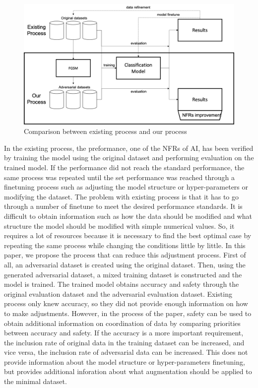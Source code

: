 \documentclass[journal,article,submit,moreauthors,pdftex]{Definitions/mdpi}
\begin{document}
\begin{figure}[H]
    \includegraphics[width=13 cm]{Definitions/comparison.png}
    \caption{Comparison between existing process and our process\label{comparison}}
\end{figure} 

In the existing process, the preformance, one of the NFRs of AI, has been verified by training the model using the original dataset and performing evaluation on the trained model.
If the performance did not reach the standard performance, the same process was repeated until the set performance was reached through a finetuning process such as adjusting the model structure or hyper-parameters or modifying the dataset.
The problem with existing process is that it has to go through a number of finetune to meet the desired performance standards.
It is difficult to obtain information such as how the data should be modified and what structure the model should be modified with simple numerical values.
So, it requires a lot of resources because it is necessary to find the best optimal case by repeating the same process while changing the conditions little by little.
In this paper, we propose the process that can reduce this adjustment process.
First of all, an adversarial dataset is created using the original dataset.
Then, using the generated adversarial dataset, a mixed training dataset is constructed and the model is trained.
The trained model obtains accuracy and safety through the original evaluation dataset and the adversarial evaluation dataset.
Existing process only knew accuracy, so they did not provide enough information on how to make adjustments.
However, in the process of the paper, safety can be used to obtain additional information on coordination of data by comparing priorities between accuracy and safety.
If the accuracy is a more important requirement, the inclusion rate of original data in the training dataset can be increased, and vice versa, the inclusion rate of adversarial data can be increased.
This does not provide information about the model structure or hyper-parameters finetuning, but provides additional inforation about what augmentation should be applied to the minimal dataset.
\end{document}
